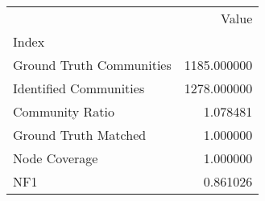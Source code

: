 \begin{tabular}{lr}
\toprule
{} &        Value \\
Index                    &              \\
\midrule
Ground Truth Communities &  1185.000000 \\
Identified Communities   &  1278.000000 \\
Community Ratio          &     1.078481 \\
Ground Truth Matched     &     1.000000 \\
Node Coverage            &     1.000000 \\
NF1                      &     0.861026 \\
\bottomrule
\end{tabular}
